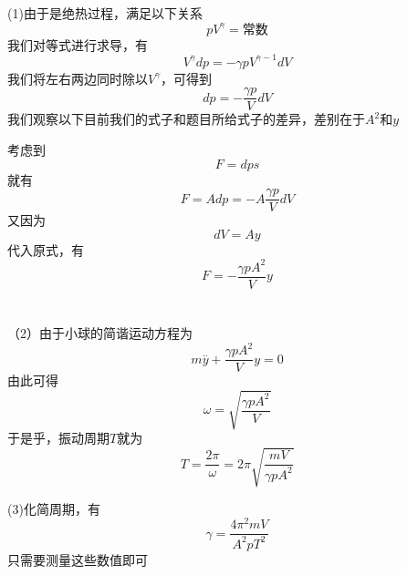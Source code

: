\documentclass[lang=cn,10pt]{elegantbook}
\begin{document}
	\begin{solution}
		(1)由于是绝热过程，满足以下关系
		\begin{equation*}
			pV^{\gamma}=\text{常数}
		\end{equation*}
		我们对等式进行求导，有
		\begin{equation*}
			V^{\gamma}dp=-\gamma pV^{\gamma-1}dV
		\end{equation*}
		我们将左右两边同时除以$V^{\gamma} $，可得到
		\begin{equation*}
			dp=-\frac{\gamma p}{V}dV
		\end{equation*}
		我们观察以下目前我们的式子和题目所给式子的差异，差别在于$A^{2}$和$y$
		
		考虑到
		\begin{equation*}
			F=dps
		\end{equation*}
		就有
		\begin{equation*}
		F=Adp=-A\frac{\gamma p}{V}dV
		\end{equation*}
		又因为
		\begin{equation}
			dV=Ay
		\end{equation}
		代入原式，有
		\begin{equation*}
			F=-\frac{\gamma p A^{2}}{V}y
		\end{equation*}
		~\\
		~\\
		
		（2）由于小球的简谐运动方程为
		\begin{equation*}
			m\overset{..}{y}+\frac{\gamma p A^{2}}{V}y=0
		\end{equation*}
		由此可得
		\begin{equation*}
			\omega =\sqrt{\frac{\gamma p A^{2}}{V}}
		\end{equation*}
		于是乎，振动周期$T$就为
		\begin{equation*}
			T=\frac{2\pi}{\omega}=2\pi\sqrt{\frac{mV}{\gamma p A^{2}}}
		\end{equation*}
		
		(3)化简周期，有
		\begin{equation*}
			\gamma =\frac{4\pi ^2mV}{A^2pT^2}
		\end{equation*}
		只需要测量这些数值即可
	\end{solution}
	
\end{document}
